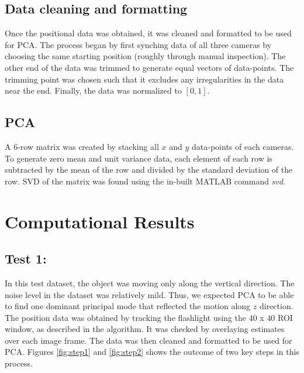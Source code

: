 \documentclass{article}
\begin{document}
\subsection{Data cleaning and formatting}
Once the positional data was obtained, it was cleaned and formatted to be used for PCA. The process began by first synching data of all three cameras by choosing the same starting position (roughly through manual inspection). The other end of the data was trimmed to generate equal vectors of data-points. The trimming point was chosen such that it excludes any irregularities in the data near the end. Finally, the data was normalized to $[0,1]$.

\subsection{PCA}
A $6$-row matrix was created by stacking all $x$ and $y$ data-points of each cameras. To generate zero mean and unit variance data, each element of each row is subtracted by the mean of the row and divided by the standard deviation of the row. SVD of the matrix was found using the in-built MATLAB command \emph{svd}.


\section{Computational Results}\label{Result}

\subsection{Test 1:}
In this test dataset, the object was moving only along the vertical direction. The noise level in the dataset was relatively mild. Thus, we expected PCA to be able to find one dominant principal mode that reflected the motion along $z$ direction. The position data was obtained by tracking the flashlight using the $40$ x $40$ ROI window, as described in the algorithm. It was checked by overlaying estimates over each image frame. The data was then cleaned and formatted to be used for PCA. Figures \ref{fig:step1} and  \ref{fig:step2} shows the outcome of two key steps in this process.
\end{document}
